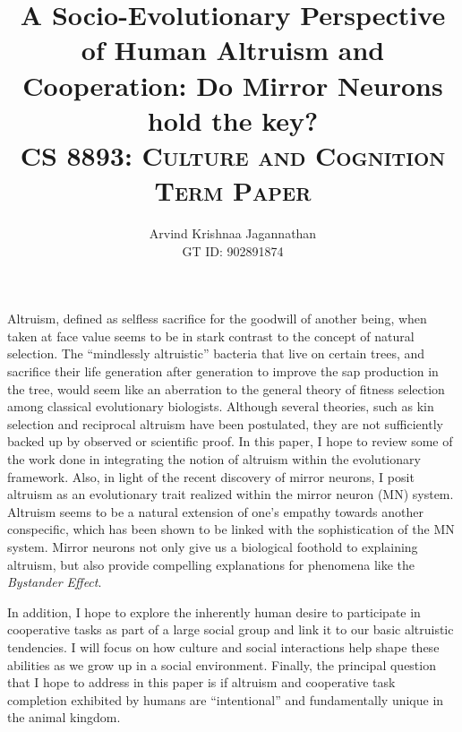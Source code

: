 \documentclass[12pt, letter]{article}
\newcommand{\doctitle}{%
A Socio-Evolutionary Perspective of Human Altruism and Cooperation: Do Mirror Neurons hold the key?}
\begin{document}
\title{\textbf{\doctitle}\\
\textsc{CS 8893: Culture and Cognition\\ Term Paper}
}
  \author {Arvind Krishnaa Jagannathan \\ GT ID: 902891874}
  \date{}
\maketitle
Altruism, defined as selfless sacrifice for the goodwill of another being, when taken at face value seems to be in stark contrast to the concept of natural selection. The ``mindlessly altruistic'' bacteria \cite{warneken2009roots} that live on certain trees, and sacrifice their life generation after generation to improve the sap production in the tree, would seem like an aberration to the general theory of fitness selection among classical evolutionary biologists. Although several theories, such as kin selection and reciprocal altruism have been postulated, they are not sufficiently backed up by observed or scientific proof. In this paper, I hope to review some of the work done in integrating the notion of altruism within the evolutionary framework. Also, in light of the recent discovery of mirror neurons, I posit altruism as an evolutionary trait realized within the mirror neuron (MN) system. Altruism seems to be a natural extension of one's empathy towards another conspecific, which has been shown \cite{decety2006social} to be linked with the sophistication of the MN system. Mirror neurons not only give us a biological foothold to explaining altruism, but also provide compelling explanations for phenomena like the \emph{Bystander Effect}. 

In addition, I hope to explore the inherently human desire to participate in cooperative tasks as part of a large social group and link it to our basic altruistic tendencies. I will focus on how culture and social interactions help shape these abilities as we grow up in a social environment. Finally, the principal question that I hope to address in this paper is if altruism and cooperative task completion exhibited by humans are ``intentional'' and fundamentally unique in the animal kingdom.
\end{document}
